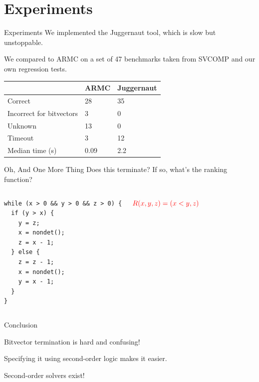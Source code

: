 \documentclass[xcolor=pdftex,t,11pt]{beamer}
\newcommand{\red}[1]{\textcolor{red}{#1}}
\begin{document}
\section{Experiments}

\begin{frame}{Experiments}
We implemented the {\sc Juggernaut} tool, which is slow but unstoppable.

\vspace{1em}

We compared to {\sc ARMC} on a set of 47 benchmarks taken from SVCOMP and our own
regression tests.

\begin{center}
 \begin{tabular}{|l||l|l|}
  \hline
  & {\sc ARMC} & {\sc Juggernaut} \\
  \hline
  \hline
  Correct & 28 & 35 \\
  Incorrect for bitvectors & 3 & 0 \\
  Unknown & 13 & 0 \\
  Timeout & 3 & 12 \\
  \hline
  Median time (s) & 0.09 & 2.2 \\
  \hline
 \end{tabular}
\end{center}
 
\end{frame}

\begin{frame}[fragile]{Oh, And One More Thing}
Does this terminate?  If so, what's the ranking function?

\begin{columns}[c]
\begin{lstlisting}[basicstyle=\normalsize]
while (x > 0 && y > 0 && z > 0) {
  if (y > x) {
    y = z;
    x = nondet();
    z = x - 1;
  } else {
    z = z - 1;
    x = nondet();
    y = x - 1;
  }
}
\end{lstlisting}

\pause
{}
$\red{R(x, y, z) = (x < y, z)}$

\end{columns}
\end{frame}


\begin{frame}{Conclusion}
\Large

  Bitvector termination is hard and confusing!

  \vspace{2em}

  Specifying it using second-order logic makes it easier.

  \vspace{2em}

  Second-order solvers exist!
  
\end{frame}
\end{document}
